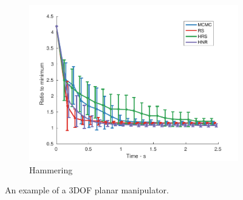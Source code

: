 \documentclass[letterpaper, 10 pt, conference]{ieeeconf}  %
\begin{document}
\begin{figure}[t!]
\begin{subfigure}[b]{0.5\textwidth}
		\includegraphics[width=\linewidth]{fig/planning_efficiency/3dof_hammering}
		\caption{Hammering}
		\label{fig:planning_efficiency:3dof:hammering}
	\end{subfigure}
	\caption{\captionstyle An example of a 3DOF planar manipulator.}
	\label{fig:planning_efficiency:3dof}
\end{figure} 
\end{document}
